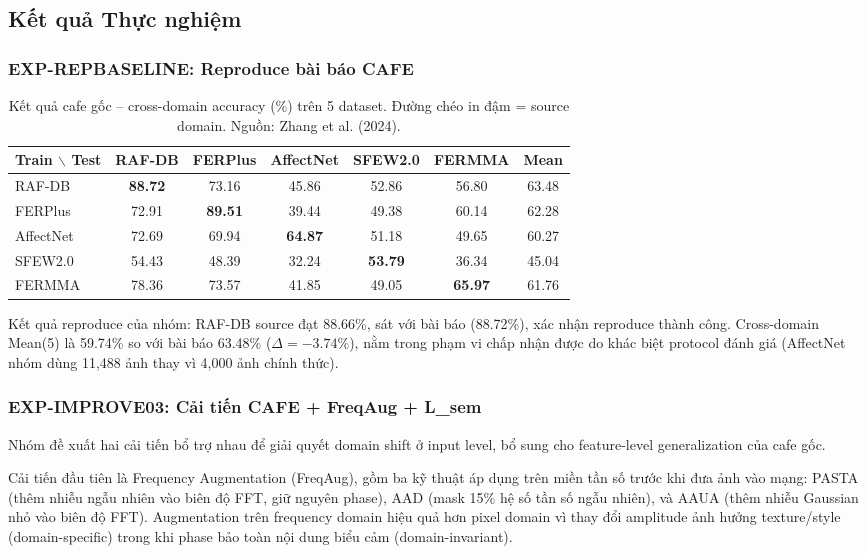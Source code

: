 \documentclass[12pt,a4paper]{article}
\let\oldtextbf\textbf
\renewcommand{\textbf}[1]{\oldtextbf{\textcolor{hcmublue}{#1}}}
\begin{document}
\subsection{Kết quả Thực nghiệm}

\subsubsection{EXP-REPBASELINE: Reproduce bài báo CAFE}

\begin{table}[H]
\centering
\small
\begin{tabular}{|l|c|c|c|c|c|c|}
\hline
\textbf{Train $\backslash$ Test} & \textbf{RAF-DB} & \textbf{FERPlus} & \textbf{AffectNet} & \textbf{SFEW2.0} & \textbf{FERMMA} & \textbf{Mean} \\ \hline
RAF-DB    & \textbf{88.72} & 73.16 & 45.86 & 52.86 & 56.80 & 63.48 \\
FERPlus   & 72.91 & \textbf{89.51} & 39.44 & 49.38 & 60.14 & 62.28 \\
AffectNet & 72.69 & 69.94 & \textbf{64.87} & 51.18 & 49.65 & 60.27 \\
SFEW2.0   & 54.43 & 48.39 & 32.24 & \textbf{53.79} & 36.34 & 45.04 \\
FERMMA    & 78.36 & 73.57 & 41.85 & 49.05 & \textbf{65.97} & 61.76 \\ \hline
\end{tabular}
\caption{Kết quả \gls{cafe} gốc -- cross-domain accuracy (\%) trên 5 dataset. Đường chéo in đậm = source domain. Nguồn: Zhang et al. (2024).}
\label{tab:paper_full}
\end{table}

Kết quả reproduce của nhóm: RAF-DB source đạt 88.66\%, sát với bài báo (88.72\%), xác nhận reproduce thành công. Cross-domain Mean(5) là 59.74\% so với bài báo 63.48\% ($\Delta = -3.74\%$), nằm trong phạm vi chấp nhận được do khác biệt protocol đánh giá (AffectNet nhóm dùng 11,488 ảnh thay vì 4,000 ảnh chính thức).

\subsubsection{EXP-IMPROVE03: Cải tiến CAFE + FreqAug + L\_sem}

Nhóm đề xuất hai cải tiến bổ trợ nhau để giải quyết domain shift ở input level, bổ sung cho feature-level generalization của \gls{cafe} gốc.

Cải tiến đầu tiên là Frequency Augmentation (FreqAug), gồm ba kỹ thuật áp dụng trên miền tần số trước khi đưa ảnh vào mạng: PASTA (thêm nhiễu ngẫu nhiên vào biên độ FFT, giữ nguyên phase), AAD (mask 15\% hệ số tần số ngẫu nhiên), và AAUA (thêm nhiễu Gaussian nhỏ vào biên độ FFT). Augmentation trên frequency domain hiệu quả hơn pixel domain vì thay đổi amplitude ảnh hưởng texture/style (domain-specific) trong khi phase bảo toàn nội dung biểu cảm (domain-invariant).
\end{document}
